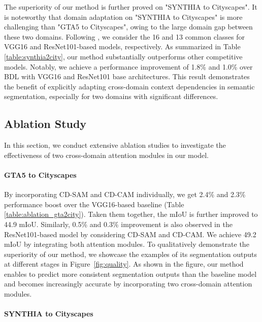 \documentclass[10pt,twocolumn,letterpaper]{article}
\begin{document}
	The superiority of our method is further proved on "SYNTHIA to Cityscapes". It is noteworthy that domain adaptation on "SYNTHIA to Cityscapes" is more challenging than "GTA5 to Cityscapes", owing to the large domain gap between these two domains. Following \cite{li2019bidirectional}, we consider the 16 and 13 common classes for VGG16 and ResNet101-based models, respectively. As summarized in Table \ref{table:synthia2city}, our method substantially outperforms other competitive models. Notably, we achieve a performance improvement of 1.8\% and 1.0\% over BDL \cite{li2019bidirectional} with VGG16 and ResNet101 base architectures. This result demonstrates the benefit of explicitly adapting cross-domain context dependencies in semantic segmentation, especially for two domains with significant differences.





	\subsection{Ablation Study}

	In this section, we conduct extensive ablation studies to investigate the effectiveness of two cross-domain attention modules in our model.

	\paragraph{GTA5 to Cityscapes}

	By incorporating CD-SAM and CD-CAM individually, we get 2.4\% and 2.3\% performance boost over the VGG16-based baseline (Table \ref{table:ablation_gta2city}). Taken them together, the mIoU is further improved to 44.9 mIoU. Similarly, 0.5\% and 0.3\% improvement is also observed in the ResNet101-based model by considering CD-SAM and CD-CAM. We achieve 49.2 mIoU by integrating both attention modules. To qualitatively demonstrate the superiority of our method, we showcase the examples of its segmentation outputs at different stages in Figure~\ref{fig:quality}. As shown in the figure, our method enables to predict more consistent segmentation outputs than the baseline model and becomes increasingly accurate by incorporating two cross-domain attention modules.

	\paragraph{SYNTHIA to Cityscapes}
\end{document}
